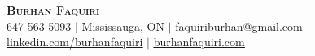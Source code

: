 \begin{center}
    \textbf{\Huge \scshape Burhan Faquiri} \\ \vspace{1pt}
    \small 647-563-5093 $|$ Mississauga, ON $|$ {faquiriburhan@gmail.com} $|$ 
    \href{https://www.linkedin.com/in/burhanfaquiri/}{\underline{linkedin.com/burhanfaquiri}} $|$
    \href{https://www.burhanfaquiri.com}{\underline{burhanfaquiri.com}}
\end{center}